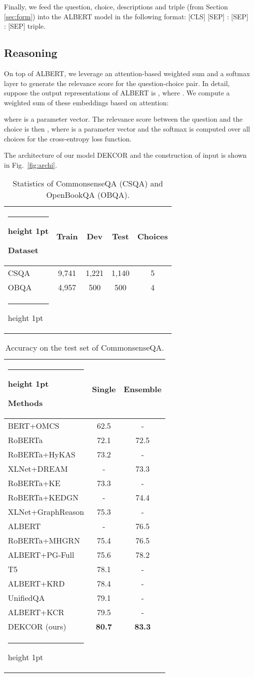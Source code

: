 \documentclass[11pt,a4paper]{article}
\makeatletter
\newcommand{\thickhline}{\noalign {\ifnum 0=`}\fi \hrule height 1pt
    \futurelet \reserved@a \@xhline
}
\makeatother
\begin{document}
Finally, we feed the question, choice, descriptions and triple (from Section \ref{sec:form}) into the ALBERT model \citep{ALBERT} in the following format:
[CLS]   [SEP] :  [SEP] :  [SEP] triple.



\vspace{-2mm}
\subsection{Reasoning}
\label{sec:reason}
On top of ALBERT, we leverage an attention-based weighted sum and a softmax layer to generate the relevance score for the question-choice pair. In detail, suppose the output representations of ALBERT is , where . We compute a weighted sum of these embeddings based on attention:

where  is a parameter vector. The relevance score between the question and the choice is then , where  is a parameter vector and the softmax is computed over all choices for the cross-entropy loss function.

The architecture of our model DEKCOR and the construction of input is shown in Fig.~\ref{fig:archi}.

\begin{table}[tb]
\centering
\caption{Statistics of CommonsenseQA (CSQA) and OpenBookQA (OBQA).}
\label{tab:statistics}
\begin{tabular}{lcccc}
\thickhline
\textbf{Dataset}& \textbf{Train} & \textbf{Dev}  & \textbf{Test} & \textbf{Choices}         \\
\hline
CSQA& 9,741 & 1,221 & 1,140 & 5\\
OBQA& 4,957 & 500 & 500 & 4\\
\thickhline
\end{tabular}
\end{table}

\begin{table}[tb]
\centering
\caption{Accuracy on the test set of CommonsenseQA.}
\label{tab:csqa}
\begin{tabular}{lcc}
\thickhline
\textbf{Methods}& \textbf{Single} & \textbf{Ensemble}           \\
\hline
BERT+OMCS & 62.5 & - \\
RoBERTa & 72.1 & 72.5 \\RoBERTa+HyKAS&73.2&-\\XLNet+DREAM&-&73.3\\
RoBERTa+KE & 73.3 & -\\
RoBERTa+KEDGN &-& 74.4\\
XLNet+GraphReason & 75.3&-\\ALBERT & -&76.5 \\ RoBERTa+MHGRN & 75.4 & 76.5\\ ALBERT+PG-Full & 75.6 & 78.2\\ T5 & 78.1 & - \\ ALBERT+KRD & 78.4 & - \\
UnifiedQA & 79.1 & -\\ALBERT+KCR &79.5 &-\\
\hline
DEKCOR (ours) & \textbf{80.7} & \textbf{83.3}\\
\thickhline
\end{tabular}
\end{table}
\end{document}

